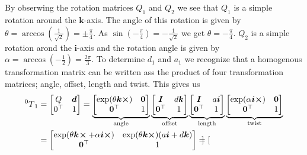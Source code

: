 \documentclass[a4paper]{scrartcl}
\begin{document}
\subsection{}
By obserwing the rotation matrices $Q_1$ and $Q_2$ we see that $Q_1$ is a simple rotation around the $\bm{k}$-axis. The angle of this rotation is given by $\theta = \arccos\left({\tfrac{1}{\sqrt{2}}}\right) = \pm\frac{\pi}{4}$. As $\sin(-\tfrac{\pi}{4}) = -\tfrac{1}{\sqrt{2}}$ we get $\theta = -\tfrac{\pi}{4}$. $Q_2$ is a simple rotation arond the $\bm{i}$-axis and the rotation angle is given by $\alpha = \arccos{\left(-\frac{1}{2} \right)} = \frac{2\pi}{3}$. To determine $d_1$ and $a_1$ we recognize that a homogenous transformation matrix can be written ass the product of four transformation matrices; angle, offset, length and twist. This gives us
\begin{equation}\label{eq:2a}
    \begin{aligned}
        \prescript{0}{}{T}_1 &= \begin{bmatrix}
            Q & \bm{d} \\ 0^\top & 1
        \end{bmatrix} = 
        \underbrace{\begin{bmatrix}
            \exp(\theta \bm{k}\cross) & \bm{0} \\ \bm{0}^\top & 1 
        \end{bmatrix}}_{\text{angle}}
        \underbrace{\begin{bmatrix}
            \bm{I} & d \bm{k} \\ \bm{0}^\top & 1
        \end{bmatrix}}_{\text{offset}}
        \underbrace{\begin{bmatrix}
            \bm{I} & a \bm{i} \\ \bm{0}^\top & 1
        \end{bmatrix}}_{\text{length}}
        \underbrace{\begin{bmatrix}
            \exp(\alpha \bm{i}\cross) & \bm{0} \\ \bm{0}^\top & 1
        \end{bmatrix}}_{\text{twist}}\\
        &= \begin{bmatrix}
            \exp(\theta \bm{k}\!\cross + \alpha \bm{i}\cross) & \exp(\theta \bm{k}\cross)(a \bm{i} + d \bm{k}) \\
            \bm{0}^\top & 1
        \end{bmatrix} = 
        \begin{bmatrix}

\end{bmatrix}
\end{aligned}
\end{equation}
\end{document}
